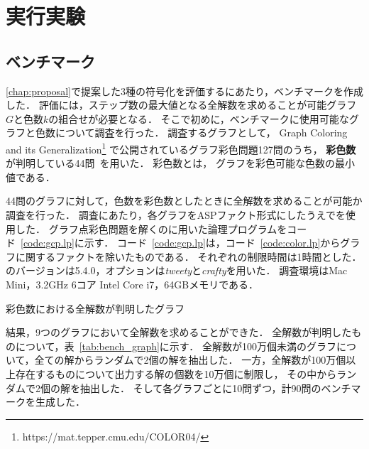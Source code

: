 \chapter{実行実験} \label{chap:experiment}

\section{ベンチマーク}
\ref{chap:proposal}で提案した3種の符号化を評価するにあたり，ベンチマークを作成した．
評価には，ステップ数の最大値となる全解数を求めることが可能グラフ$G$と色数$k$の組合せが必要となる．
そこで初めに，ベンチマークに使用可能なグラフと色数について調査を行った．
調査するグラフとして，
Graph Coloring and its Generalization\footnote{https://mat.tepper.cmu.edu/COLOR04/}
で公開されているグラフ彩色問題127問のうち，
\textbf{彩色数}が判明している44問~\cite{DBLP:journals/constraints/TamuraTKB09}を用いた．
彩色数とは， グラフを彩色可能な色数の最小値である．

44問のグラフに対して，色数を彩色数としたときに全解数を求めることが可能か調査を行った．
調査にあたり，各グラフをASPファクト形式にしたうえで{\clingo}を使用した．
グラフ点彩色問題を解くのに用いた論理プログラムをコード~\ref{code:gcp.lp}に示す．
コード~\ref{code:gcp.lp}は，コード~\ref{code:color.lp}からグラフに関するファクトを除いたものである．
それぞれの制限時間は1時間とした．
{\clingo}のバージョンは5.4.0，オプションは\textsl{tweety}と\textsl{crafty}を用いた．
調査環境はMac Mini，3.2GHz 6コア Intel Core i7，64GBメモリである．



\begin{table}[tb]
  \centering
  \caption{彩色数における全解数が判明したグラフ}
  
  \label{tab:bench_graph}
\end{table}

結果，9つのグラフにおいて全解数を求めることができた．
全解数が判明したものについて，表~\ref{tab:bench_graph}に示す．
全解数が100万個未満のグラフについて，全ての解からランダムで2個の解を抽出した．
一方，全解数が100万個以上存在するものについて出力する解の個数を10万個に制限し，
その中からランダムで2個の解を抽出した．
そして各グラフごとに10問ずつ，計90問のベンチマークを生成した．

